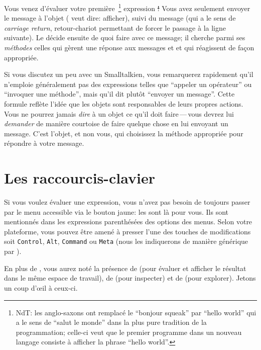 \documentclass[a4paper,10pt,twoside]{book}
\begin{document}
Vous venez d'\'evaluer votre premi\`ere~\footnote{NdT: les anglo-saxons
ont remplac\'e le ``bonjour squeak'' par ``hello world'' qui a le
sens de ``salut le monde'' dans la plus pure tradition de la
programmation; celle-ci veut que le premier programme
dans un nouveau langage consiste \`a afficher la phrase ``hello
world''.}
expression \st!
Vous avez seulement envoyer le message  \`a
l'objet  ( veut dire: afficher), suivi du
message  
(qui a le sens de \emph{carriage return}, \cad retour-chariot
permettant de forcer le passage \`a la ligne suivante).
Le  d\'ecide ensuite de quoi faire avec ce message; il
cherche parmi ses \emph{m\'ethodes} celles qui g\`erent une r\'eponse
aux messages  et  et qui r\'eagissent de fa\c{c}on
appropri\'ee.

Si vous discutez un peu avec un Smalltalkien, vous remarquerez
rapidement qu'il n'emploie g\'en\'eralement pas des expressions
telles que ``appeler un op\'erateur'' ou ``invoquer une m\'ethode'',
mais qu'il dit plut\^ot ``envoyer un message''.
Cette formule refl\`ete l'id\'ee que les objets sont responsables de
leurs propres actions. Vous ne pourrez jamais \emph{dire} \`a un objet
ce qu'il doit faire\,---\,vous devrez lui \emph{demander} de mani\`ere
courtoise de faire quelque chose en lui envoyant un message.
C'est l'objet, et non vous, qui choisissez la m\'ethode appropri\'ee
pour r\'epondre \`a votre message.

\section{Les raccourcis-clavier}

Si vous voulez \'evaluer une expression, vous n'avez pas besoin de
toujours passer par le menu accessible via le bouton jaune: les
 sont l\`a pour vous. Ils sont mentionn\'es
dans les expressions parenth\'es\'ees des options des menus. Selon
votre plateforme, vous pouvez \^etre amen\'e \`a presser l'une des
touches de modifications soit \texttt{Control}, \texttt{Alt},
\texttt{Command} ou \texttt{Meta} (nous les indiquerons de mani\`ere
g\'en\'erique par ).


En plus de , vous aurez not\'e la pr\'esence de
(pour \'evaluer et afficher le r\'esultat dans le m\^eme espace de travail), 
de  (pour inspecter) et de  (pour
explorer). 
Jetons un coup d'\oe il \`a ceux-ci.
\end{document}
